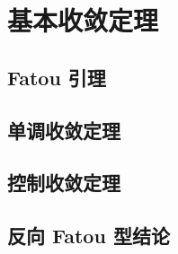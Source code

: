 \section{基本收敛定理}
\label{b1:sec:0503}


\subsection{Fatou 引理}
\label{b1:subsec:050301}

\subsection{单调收敛定理}
\label{b1:subsec:050302}

\subsection{控制收敛定理}
\label{b1:subsec:050303}

\subsection{反向 Fatou 型结论}
\label{b1:subsec:050304}


